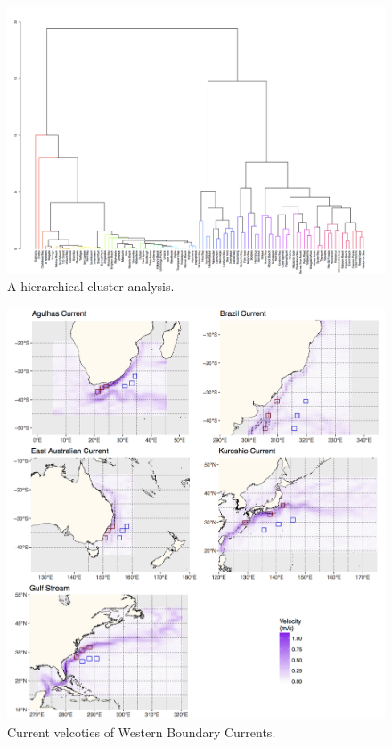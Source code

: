 \documentclass[]{book}
\theoremstyle{definition}
\theoremstyle{definition}
\theoremstyle{definition}
\theoremstyle{remark}
\begin{document}
\begin{figure}

{\centering \includegraphics[width=1\linewidth]{figures/hierarchical_clustsig} 

}

\caption{A hierarchical cluster analysis.}\label{fig:example15}
\end{figure}

\begin{figure}

{\centering \includegraphics[width=1\linewidth]{figures/Fig01_AvisoMeanVelocityMean} 

}

\caption{Current velcoties of Western Boundary Currents.}\label{fig:example17}
\end{figure}
\end{document}
